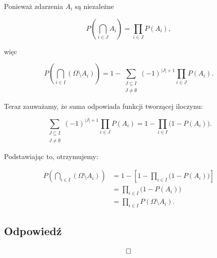 Ponieważ zdarzenia \(A_i\) są niezależne

\[
	P\!\left( \bigcap_{i \in J} A_i \right) = \prod_{i \in J} P(A_i),
\]

więc

\[
	P\!\left( \bigcap_{i \in I} (\Omega \setminus A_i) \right)
	= 1 - \sum_{\substack{J \subseteq I \\ J \neq \emptyset}} (-1)^{|J|+1} \prod_{i \in J} P(A_i).
\]

Teraz zauważamy, że suma odpowiada funkcji tworzącej iloczynu:

\[
	\sum_{\substack{J \subseteq I \\ J \neq \emptyset}} (-1)^{|J|+1} \prod_{i \in J} P(A_i)
	= 1 - \prod_{i \in I} \big( 1 - P(A_i) \big).
\]

Podstawiając to, otrzymujemy:

\begin{align*}
	P\!\left( \bigcap_{i \in I} (\Omega \setminus A_i) \right)
	 & = 1 - \left[ 1 - \prod_{i \in I} \big( 1 - P(A_i) \big) \right] \\
	 & = \prod_{i \in I} \big( 1 - P(A_i) \big)                        \\
	 & = \prod_{i \in I} P(\Omega \setminus A_i).
\end{align*}


\subsection*{Odpowiedź}
\[
	\hfill \square
\]

